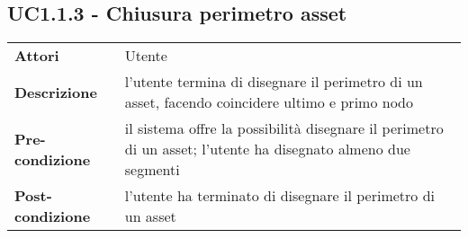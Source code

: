 \subsection{UC1.1.3 - Chiusura perimetro asset}
\label{sssec:UC1.1.3}
\def\arraystretch{1.5}
\begin{tabularx}{\textwidth}{l|p{}}
\rowcolor{I} \multicolumn{2}{c}{\color{white}\textbf{UC1.1.3 - Chiusura perimetro asset}} \\
\toprule
\endhead
\textbf{Attori} & Utente\\
\textbf{Descrizione} & l'utente termina di disegnare il perimetro di un asset, facendo coincidere ultimo e primo nodo\\
\textbf{Pre-condizione} & il sistema offre la possibilità  disegnare il perimetro di un asset; l'utente ha disegnato almeno due segmenti\\
\textbf{Post-condizione} & l'utente ha terminato di disegnare il perimetro di un asset\\
\bottomrule
\end{tabularx}
